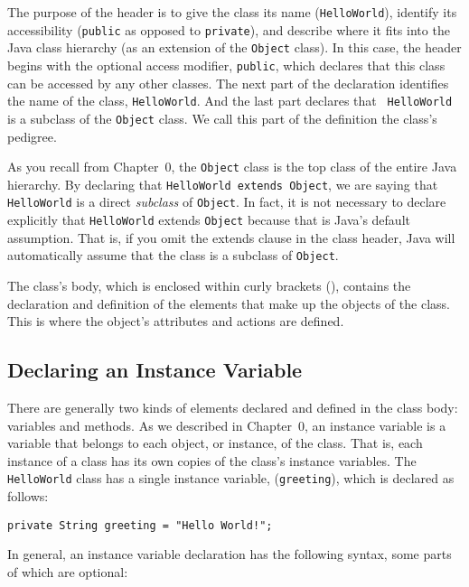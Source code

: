 \noindent The purpose of the header is to give the class its name 
({\tt HelloWorld}), identify its accessibility ({\tt public} as
opposed to {\tt private}), and describe where it fits into the Java class
hierarchy (as an extension of the {\tt Object} class). In this case,
the header begins with the optional access modifier, {\tt public},
which declares that this class can be accessed by any other
classes. The next part of the declaration identifies the name of the
class, {\tt HelloWorld}. And the last part declares that {\tt
HelloWorld} is a subclass of the {\tt Object} class. We call this
part of the definition the class's pedigree.

As you recall from Chapter~0, the {\tt Object} class is the top class
of the entire Java hierarchy. By declaring that {\tt HelloWorld
extends Object}, we are saying that {\tt HelloWorld} is a direct {\em
subclass} of {\tt Object}.  In fact, it is not necessary to declare
explicitly that {\tt HelloWorld} extends {\tt Object} because that is
Java's default assumption. That is, if you omit the extends clause in
the class header, Java will automatically assume that the class is a
subclass of {\tt Object}.

The class's body, which is enclosed within curly brackets ({}),
contains the declaration and definition of the elements that make up
the objects of the class.  This is where the object's attributes and
actions are defined. 

\subsection{Declaring an Instance Variable}
\label{sec-vardecl}

There are generally two kinds of elements declared and defined in the
class body: variables and methods. As we described in Chapter~0, an
instance variable is a variable that belongs to each object, or
instance, of the class. That is, each instance of a class has its own
copies of the class's instance variables.  The {\tt HelloWorld} class
has a single instance variable, ({\tt greeting}), which is declared as
follows:

\begin{jjjlisting}
\begin{lstlisting}
private String greeting = "Hello World!"; 
\end{lstlisting}
\end{jjjlisting}

\noindent In general, an instance variable declaration has the following
syntax, some parts of which are optional:

